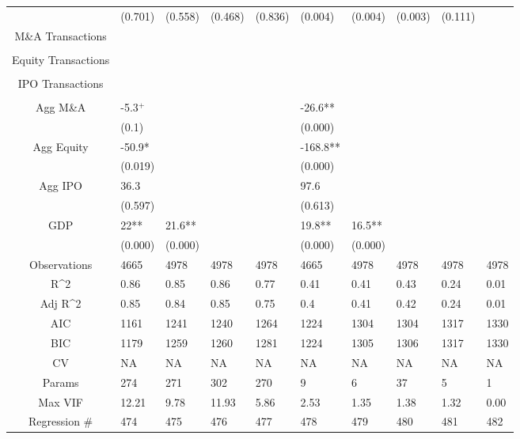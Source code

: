 \documentclass{article}
\begin{document}
\begin{table}[H]
\begin{tabular}{|clllllllll|}
   & (0.701) & (0.558) & (0.468) & (0.836) & (0.004) & (0.004) & (0.003) & (0.111) &  \\
  M\&A Transactions &  &  &  &  &  &  &  &  &  \\
   &  &  &  &  &  &  &  &  &  \\
  Equity Transactions &  &  &  &  &  &  &  &  &  \\
   &  &  &  &  &  &  &  &  &  \\
  IPO Transactions &  &  &  &  &  &  &  &  &  \\
   &  &  &  &  &  &  &  &  &  \\
  Agg M\&A & -5.3$^{+}$ &  &  &  & -26.6** &  &  &  &  \\
   & (0.1) &  &  &  & (0.000) &  &  &  &  \\
  Agg Equity & -50.9* &  &  &  & -168.8** &  &  &  &  \\
   & (0.019) &  &  &  & (0.000) &  &  &  &  \\
  Agg IPO & 36.3 &  &  &  & 97.6 &  &  &  &  \\
   & (0.597) &  &  &  & (0.613) &  &  &  &  \\
  GDP & 22** & 21.6** &  &  & 19.8** & 16.5** &  &  &  \\
   & (0.000) & (0.000) &  &  & (0.000) & (0.000) &  &  &  \\
  \hline
 Observations & 4665 & 4978 & 4978 & 4978 & 4665 & 4978 & 4978 & 4978 & 4978 \\
  R^2 & 0.86 & 0.85 & 0.86 & 0.77 & 0.41 & 0.41 & 0.43 & 0.24 & 0.01 \\
  Adj R^2 & 0.85 & 0.84 & 0.85 & 0.75 & 0.4 & 0.41 & 0.42 & 0.24 & 0.01 \\
  AIC & 1161 & 1241 & 1240 & 1264 & 1224 & 1304 & 1304 & 1317 & 1330 \\
  BIC & 1179 & 1259 & 1260 & 1281 & 1224 & 1305 & 1306 & 1317 & 1330 \\
  CV & NA & NA & NA & NA & NA & NA & NA & NA & NA \\
  Params & 274 & 271 & 302 & 270 & 9 & 6 & 37 & 5 & 1 \\
  Max VIF & 12.21 & 9.78 & 11.93 & 5.86 & 2.53 & 1.35 & 1.38 & 1.32 & 0.00 \\
  Regression \# & 474 & 475 & 476 & 477 & 478 & 479 & 480 & 481 & 482 \\
   \hline
\end{tabular}

\end{table}
\end{document}
